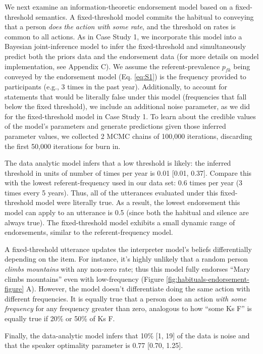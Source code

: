 \documentclass[english,floatsintext,man]{apa6}
\theoremstyle{definition}
\theoremstyle{definition}
\theoremstyle{definition}
\theoremstyle{remark}
\begin{document}
We next examine an information-theoretic endorsement model based on a
fixed-threshold semantics. A fixed-threshold model commits the habitual
to conveying that a person \emph{does the action with some rate}, and
the threshold on rates is common to all actions. As in Case Study 1, we
incorporate this model into a Bayesian joint-inference model to infer
the fixed-threshold and simultaneously predict both the priors data and
the endorsement data (for more details on model implementation, see
Appendix C). We assume the referent-prevalence \(p_{fk}\) being conveyed
by the endorsement model (Eq. \ref{eq:S1}) is the frequency provided to
participants (e.g., 3 times in the past year). Additionally, to account
for statements that would be literally false under this model
(frequencies that fall below the fixed threshold), we include an
additional noise parameter, as we did for the fixed-threshold model in
Case Study 1. To learn about the credible values of the model's
parameters and generate predictions given those inferred parameter
values, we collected 2 MCMC chains of 100,000 iterations, discarding the
first 50,000 iterations for burn in.

The data analytic model infers that a low threshold is likely: the
inferred threshold in units of number of times per year is 0.01 {[}0.01,
0.37{]}. Compare this with the lowest referent-frequency used in our
data set: \(0.6\) times per year (3 times every 5 years). Thus, all of
the utterances evaluated under this fixed-threshold model were literally
true. As a result, the lowest endorsement this model can apply to an
utterance is 0.5 (since both the habitual and silence are always true).
The fixed-threshold model exhibits a small dynamic range of
endorsements, similar to the referent-frequency model.

A fixed-threshold utterance updates the interpreter model's beliefs
differentially depending on the item. For instance, it's highly unlikely
that a random person \emph{climbs mountains} with any non-zero rate;
thus this model fully endorses \enquote{Mary climbs mountains} even with
low-frequency (Figure \ref{fig:habituals-endorsement-figure} A).
However, the model doesn't differentiate doing the same action with
different frequencies. It is equally true that a person does an action
\emph{with some frequency} for any frequency greater than zero,
analogous to how \enquote{some Ks F} is equally true if 20\% or 50\% of
Ks F.

Finally, the data-analytic model infers that 10\% {[}1, 19{]} of the
data is noise and that the speaker optimality parameter is 0.77 {[}0.70,
1.25{]}.
\end{document}
